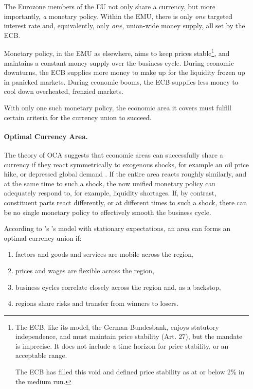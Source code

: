 \documentclass[11pt,a4paper,oneside,openright]{article}
\begin{document}
The Eurozone members of the \gls{EU} not only share a currency, but more importantly, \emph{a} monetary policy. 
Within the \gls{EMU}, there is only \emph{one} targeted interest rate and, equivalently, only \emph{one}, union-wide money supply, all set by the \gls{ECB}.

Monetary policy, in the \gls{EMU} as elsewhere, aims to keep prices stable\footnote{
	The \gls{ECB}, like its model, the German Bundesbank, enjoys statutory independence, and must maintain price stability (Art. 27), but the mandate is imprecise. 
	It does not include a time horizon for price stability, or an acceptable range.
	
	The \gls{ECB} has filled this void and defined price stability as at or below 2\% in the medium run.}, 
and maintains a constant money supply over the business cycle. 
During economic downturns, the \gls{ECB} supplies more money to make up for the liquidity frozen up in panicked markets. 
During economic booms, the \gls{ECB} supplies less money to cool down overheated, frenzied markets. 

With only one such monetary policy, the economic area it covers must fulfill certain criteria for the currency union to succeed.

\paragraph{Optimal Currency Area.}  \label{sec:OCA} The theory of \gls{OCA} suggests that economic areas can successfully share a currency if they react symmetrically to exogenous shocks, for example an oil price hike, or depressed global demand \citep{Mundell1961}. 
If the entire area reacts roughly similarly, and at the same time to such a shock, the now unified monetary policy can adequately respond to, for example, liquidity shortages. 
If, by contrast, constituent parts react differently, or at different times to such a shock, there can be no single monetary policy to effectively smooth the business cycle.

According to \citeauthor{Mundell1961}'s \citeyearpar{Mundell1961}'s  model with stationary expectations, an area can forms an optimal currency union if:
\begin{enumerate}
	\item factors and goods and services are mobile across the region, 
	\item prices and wages are flexible across the region,
	\item business cycles correlate closely across the region and, as a backstop,
	\item regions share risks and transfer from winners to losers.
\end{enumerate}
\end{document}

